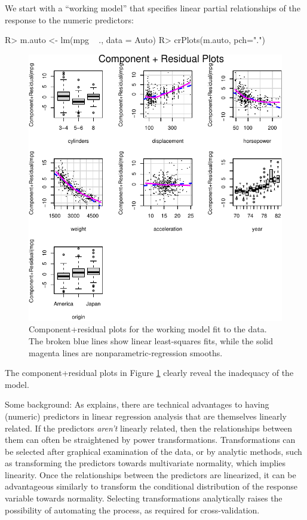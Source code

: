 \documentclass[
]{jss}
\begin{document}
We start with a ``working model'' that specifies linear partial
relationships of the response to the numeric predictors:

\begin{CodeChunk}
\begin{CodeInput}
R> m.auto <- lm(mpg ~ ., data = Auto)
R> crPlots(m.auto, pch=".")
\end{CodeInput}
\begin{figure}

{\centering \includegraphics[width=0.6\linewidth]{JSS-article-3_files/figure-latex/Auto-working-model-1} 

}

\caption[Component+residual plots for the working model fit to the  data]{Component+residual plots for the working model fit to the  data. The broken blue lines show linear least-squares fits, while the solid magenta lines are nonparametric-regression smooths.}\label{fig:Auto-working-model}
\end{figure}
\end{CodeChunk}

The component+residual plots in Figure \ref{fig:Auto-working-model}
clearly reveal the inadequacy of the model.

Some background: As \citet[Sec. 8.2]{Weisberg:2014} explains, there are
technical advantages to having (numeric) predictors in linear regression
analysis that are themselves linearly related. If the predictors
\emph{aren't} linearly related, then the relationships between them can
often be straightened by power transformations. Transformations can be
selected after graphical examination of the data, or by analytic
methods, such as transforming the predictors towards multivariate
normality, which implies linearity. Once the relationships between the
predictors are linearized, it can be advantageous similarly to transform
the conditional distribution of the response variable towards normality.
Selecting transformations analytically raises the possibility of
automating the process, as required for cross-validation.
\end{document}
